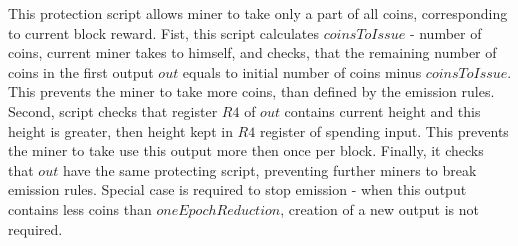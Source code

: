 This protection script allows miner to take only a part of all coins, corresponding to current block reward.
Fist, this script calculates $coinsToIssue$ - number of coins, current miner takes to himself,
and checks, that the remaining  number of coins in the first output $out$ equals to initial
number of coins minus $coinsToIssue$.
This prevents the miner to take more coins, than defined by the emission rules.
Second, script checks that register $R4$ of $out$ contains current height and this height is greater, then height
kept in $R4$ register of spending input.
This prevents the miner to take use this output more then once per block.
Finally, it checks that $out$ have the same protecting script, preventing further miners to break emission rules.
Special case is required to stop emission - when this output contains less coins than $oneEpochReduction$,
creation of a new output is not required.

